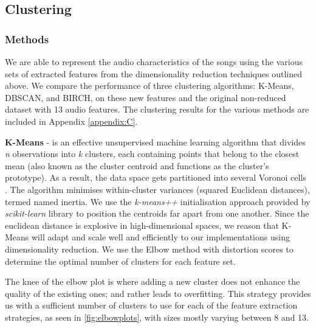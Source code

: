 \subsection{Clustering}
\subsubsection{Methods}
We are able to represent the audio characteristics of the songs using the various sets of extracted features from the dimensionality reduction techniques outlined above. We compare the performance of three clustering algorithms: K-Means, DBSCAN, and BIRCH, on these new features and the original non-reduced dataset with 13 audio features. The clustering results for the various methods are included in Appendix \ref{appendix:C}.

\textbf{K-Means} - is an effective unsupervised machine learning algorithm that divides \textit{n} observations into \textit{k} clusters, each containing points that belong to the closest mean (also known as the cluster centroid and functions as the cluster's prototype). As a result, the data space gets partitioned into several Voronoi cells \cite{kmeans}. The algorithm minimises within-cluster variances (squared Euclidean distances), termed named inertia. We use the \textit{k-means++} initialisation approach provided by \textit{scikit-learn} library to position the centroids far apart from one another. Since the euclidean distance is explosive in high-dimensional spaces, we reason that K-Means will adapt and scale well and efficiently to our implementations using dimensionality reduction. We use the Elbow method with distortion scores to determine the optimal number of clusters for each feature set.

The knee of the elbow plot is where adding a new cluster does not enhance the quality of the existing ones; and rather leads to overfitting. This strategy provides us with a sufficient number of clusters to use for each of the feature extraction strategies, as seen in \ref{fig:elbowplots}, with sizes mostly varying between 8 and 13.

